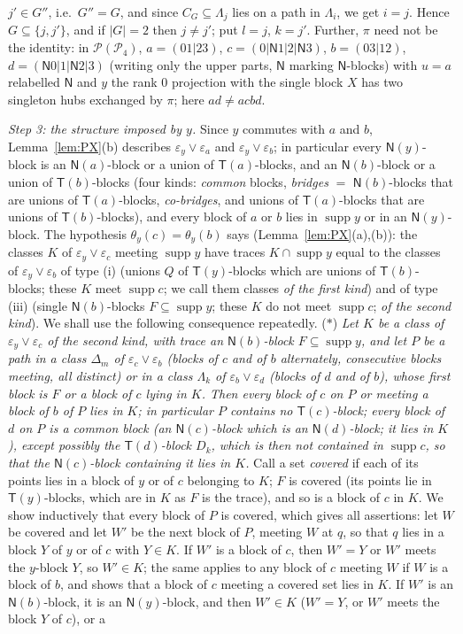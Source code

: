 \documentclass[11pt]{amsart}
\theoremstyle{definition}
\renewcommand{\P}{\mathcal{P}}
\newcommand{\supp}{\operatorname{supp}}
\newcommand{\T}{\mathsf{T}}
\newcommand{\N}{\mathsf{N}}
\begin{document}
$j'\in G''$, i.e.\ $G''=G$, and since $C_G\subseteq\Lambda_j$ lies on a path in $\Lambda_i$, we get $i=j$. Hence $G\subseteq\{j,j'\}$, and if $|G|=2$ then $j\ne j'$; put $l=j$, $k=j'$. Further, $\pi$ need not be the identity: in $\P(\P_4)$, $a=(01|23)$, $c=(0|\N1|2|\N3)$, $b=(03|12)$, $d=(\N0|1|\N2|3)$ (writing only the upper parts, $\N$ marking $\N$-blocks) with $u=a$ relabelled $\N$ and $y$ the rank $0$ projection with the single block $X$ has two singleton hubs exchanged by $\pi$; here $ad\ne acbd$.

\smallskip
\emph{Step 3: the structure imposed by $y$.} Since $y$ commutes with $a$ and $b$, Lemma~\ref{lem:PX}(b) describes $\varepsilon_y\vee\varepsilon_a$ and $\varepsilon_y\vee\varepsilon_b$; in particular every $\N(y)$-block is an $\N(a)$-block or a union of $\T(a)$-blocks, and an $\N(b)$-block or a union of $\T(b)$-blocks (four kinds: \emph{common} blocks, \emph{bridges} $=$ $\N(b)$-blocks that are unions of $\T(a)$-blocks, \emph{co-bridges}, and unions of $\T(a)$-blocks that are unions of $\T(b)$-blocks), and every block of $a$ or $b$ lies in $\supp y$ or in an $\N(y)$-block. The hypothesis $\theta_y(c)=\theta_y(b)$ says (Lemma~\ref{lem:PX}(a),(b)): the classes $K$ of $\varepsilon_y\vee\varepsilon_c$ meeting $\supp y$ have traces $K\cap\supp y$ equal to the classes of $\varepsilon_y\vee\varepsilon_b$ of type (i) (unions $Q$ of $\T(y)$-blocks which are unions of $\T(b)$-blocks; these $K$ meet $\supp c$; we call them classes \emph{of the first kind}) and of type (iii) (single $\N(b)$-blocks $F\subseteq\supp y$; these $K$ do not meet $\supp c$; \emph{of the second kind}). We shall use the following consequence repeatedly. \textup{($*$)} \emph{Let $K$ be a class of $\varepsilon_y\vee\varepsilon_c$ of the second kind, with trace an $\N(b)$-block $F\subseteq\supp y$, and let $P$ be a path in a class $\Delta_m$ of $\varepsilon_c\vee\varepsilon_b$ (blocks of $c$ and of $b$ alternately, consecutive blocks meeting, all distinct) or in a class $\Lambda_k$ of $\varepsilon_b\vee\varepsilon_d$ (blocks of $d$ and of $b$), whose first block is $F$ or a block of $c$ lying in $K$. Then every block of $c$ on $P$ or meeting a block of $b$ of $P$ lies in $K$; in particular $P$ contains no $\T(c)$-block; every block of $d$ on $P$ is a common block (an $\N(c)$-block which is an $\N(d)$-block; it lies in $K$), except possibly the $\T(d)$-block $D_k$, which is then not contained in $\supp c$, so that the $\N(c)$-block containing it lies in $K$.} Call a set \emph{covered} if each of its points lies in a block of $y$ or of $c$ belonging to $K$; $F$ is covered (its points lie in $\T(y)$-blocks, which are in $K$ as $F$ is the trace), and so is a block of $c$ in $K$. We show inductively that every block of $P$ is covered, which gives all assertions: let $W$ be covered and let $W'$ be the next block of $P$, meeting $W$ at $q$, so that $q$ lies in a block $Y$ of $y$ or of $c$ with $Y\in K$. If $W'$ is a block of $c$, then $W'=Y$ or $W'$ meets the $y$-block $Y$, so $W'\in K$; the same applies to any block of $c$ meeting $W$ if $W$ is a block of $b$, and shows that a block of $c$ meeting a covered set lies in $K$. If $W'$ is an $\N(b)$-block, it is an $\N(y)$-block, and then $W'\in K$ ($W'=Y$, or $W'$ meets the block $Y$ of $c$), or a 
\end{document}
